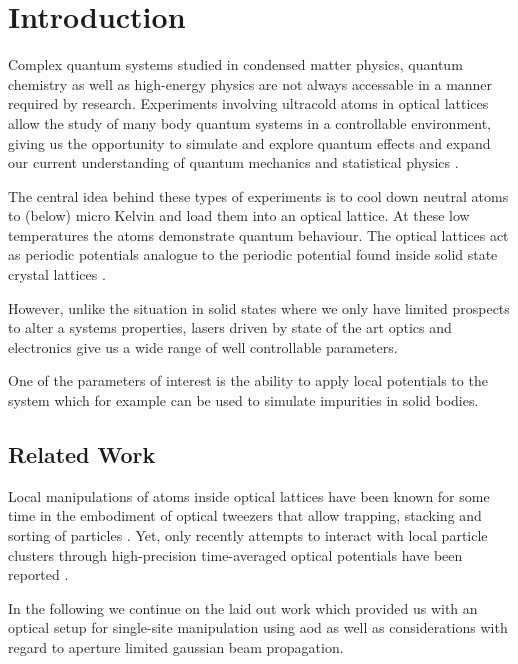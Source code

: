 \chapter{Introduction}

Complex quantum systems studied in condensed matter physics, quantum chemistry
as well as high-energy physics are not always accessable in a manner
required by research. Experiments involving ultracold atoms in optical
lattices allow the study of many body quantum systems in a controllable
environment, giving us the opportunity to simulate and explore quantum
effects and expand our current understanding of quantum mechanics and
statistical physics \cite{Gross2017}.

The central idea behind these types of experiments is to cool down neutral
atoms to (below) micro Kelvin and load them into an optical lattice. At these
low temperatures the atoms demonstrate quantum behaviour. The optical lattices
act as periodic potentials analogue to the periodic potential found inside
solid state crystal lattices \cite{Lewenstein2007}.

However, unlike the situation in solid states where we only have limited
prospects to alter a systems properties, lasers driven by state of the art
optics and electronics give us a wide range of well controllable parameters.

One of the parameters of interest is the ability to apply local potentials
to the system which for example can be used to simulate impurities in solid
bodies.

\section{Related Work}


Local manipulations of atoms inside optical lattices have been known for some
time in the embodiment of optical tweezers that allow trapping, stacking and
sorting of particles \cite{Tadmor2014}. Yet, only recently attempts to
interact with local particle clusters through high-precision time-averaged
optical potentials have been reported \cite{Roy2016}.

In the following we continue on the laid out work \cite{Hertlein2017} which
provided us with an optical setup for single-site manipulation using
\gls{aod} as well as considerations with regard to aperture limited
gaussian beam propagation.

